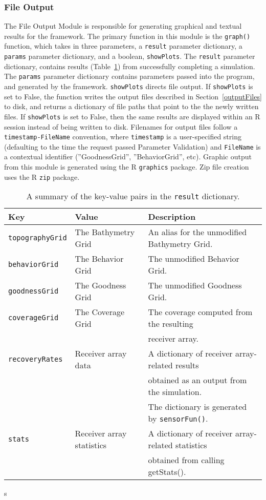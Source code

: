 \subsubsection{File Output}
The File Output Module is responsible for generating graphical and textual results for the framework.  The primary function in this module is the \texttt{graph()} function, which takes in three parameters, a \texttt{result} parameter dictionary, a \texttt{params} parameter dictionary, and a boolean, \texttt{showPlots}.  The \texttt{result} parameter dictionary, contains results (Table~\ref{resultDict}) from successfully completing a simulation.  The \texttt{params} parameter dictionary contains parameters passed into the program, and generated by the framework.  \texttt{showPlots} directs file output.  If \texttt{showPlots} is set to False, the function writes the output files described in Section~\ref{outputFiles} to disk, and returns a dictionary of file paths that point to the the newly written files.  If \texttt{showPlots} is set to False, then the same results are displayed within an R session instead of being written to disk.  Filenames for output files follow a \texttt{timestamp-FileName} convention, where \texttt{timestamp} is a user-specified string (defaulting to the time the request passed Parameter Validation) and \texttt{FileName} is a contextual identifier (''GoodnessGrid'', ''BehaviorGrid'', etc).  Graphic output from this module is generated using the R \texttt{graphics} package.  Zip file creation uses the 
R \texttt{zip} package.

\begin{table}[ht]
	\begin{tabular}{l l l}
		Key	&	Value &	Description\\
		\hline
		\texttt{topographyGrid}	&	The Bathymetry Grid			&	An alias for the unmodified Bathymetry Grid.\\
		\texttt{behaviorGrid}	&	The Behavior Grid			&	The unmodified Behavior Grid.\\
		\texttt{goodnessGrid}	&	The Goodness Grid			&	The unmodified Goodness Grid.\\
		\texttt{coverageGrid}	& 	The Coverage Grid			&	The coverage computed from the resulting\\
								&								&	receiver array.\\
		\texttt{recoveryRates}	& 	Receiver array data			&	A dictionary of receiver array-related results\\
								&								&  obtained as an output from the simulation. \\
								&								&  The dictionary is generated by \texttt{sensorFun()}.\\
		\texttt{stats}			& 	Receiver array statistics	&	A dictionary of receiver array-related statistics\\
								&								&  obtained from calling getStats().\\
	\end{tabular}
	\caption{A summary of the key-value pairs in the \texttt{result} dictionary.
		\label{resultDict}}s
\end{table}

